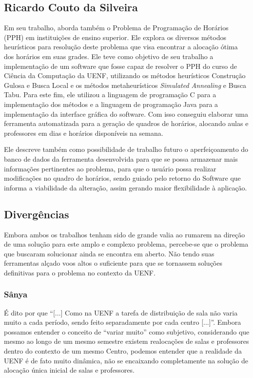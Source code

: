 \subsection{Ricardo Couto da Silveira} \label{subsec:ricardo} %

Em seu trabalho,  aborda também o Problema de Programação de Horários (PPH) em instituições de ensino superior. Ele explora os diversos métodos heurísticos para resolução deste problema que visa encontrar a alocação ótima dos horários em suas grades. Ele teve como objetivo de seu trabalho a implementação de um software que fosse capaz de resolver o PPH do curso de Ciência da Computação da UENF, utilizando os métodos heurísticos Construção Gulosa e Busca Local e os métodos metaheurísticos \textit{Simulated Annealing} e Busca Tabu. Para este fim, ele utilizou a linguagem de programação C para a implementação dos métodos e a linguagem de programação Java para a implementação da interface gráfica do software. Com isso conseguiu elaborar uma ferramenta automatizada para a geração de quadros de horários, alocando aulas e professores em dias e horários disponíveis na semana.

Ele descreve também como possibilidade de trabalho futuro o aperfeiçoamento do banco de dados da ferramenta desenvolvida para que se possa armazenar mais informações pertinentes ao problema, para que o usuário possa realizar modificações no quadro de horários, sendo guiado pelo retorno do Software que informa a viabilidade da alteração, assim gerando maior flexibilidade à aplicação.

\subsection{Divergências} \label{subsec:divergencias}         %

Embora ambos os trabalhos tenham sido de grande valia ao rumarem na direção de uma solução para este amplo e complexo problema, percebe-se que o problema que buscaram solucionar ainda se encontra em aberto. Não tendo suas ferramentas alçado voos altos o suficiente para que se tornassem soluções definitivas para o problema no contexto da UENF.

\subsubsection*{Sânya} \label{subsubsec:sanya} %

É dito por  que ``[...] Como na UENF a tarefa de distribuição de sala não varia muito a cada período, sendo feito separadamente por cada centro [...]''. Embora possamos entender o conceito de ``variar muito'' como subjetivo, considerando que mesmo ao longo de um mesmo semestre existem realocações de salas e professores dentro do contexto de um mesmo Centro, podemos entender que a realidade da UENF é de fato muito dinâmica, não se encaixando completamente na solução de alocação única inicial de salas e professores.

